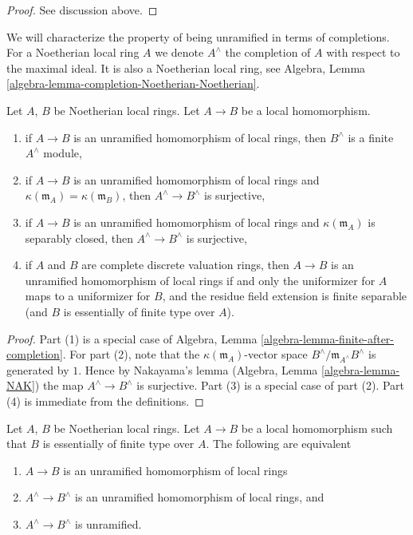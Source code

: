 \begin{proof}
See discussion above.
\end{proof}

\noindent
We will characterize the property of being unramified in terms
of completions. For a Noetherian local ring $A$
we denote $A^\wedge$ the completion of $A$ with respect to the
maximal ideal. It is also a Noetherian local ring, see
Algebra, Lemma \ref{algebra-lemma-completion-Noetherian-Noetherian}.

\begin{lemma}
\label{lemma-unramified-completions}
Let $A$, $B$ be Noetherian local rings.
Let $A \to B$ be a local homomorphism.
\begin{enumerate}
\item if $A \to B$ is an unramified homomorphism of local rings,
then $B^\wedge$ is a finite $A^\wedge$ module,
\item if $A \to B$ is an unramified homomorphism of local rings and
$\kappa(\mathfrak m_A) = \kappa(\mathfrak m_B)$,
then $A^\wedge \to B^\wedge$ is surjective,
\item if $A \to B$ is an unramified homomorphism of local rings
and $\kappa(\mathfrak m_A)$
is separably closed, then $A^\wedge \to B^\wedge$ is surjective,
\item if $A$ and $B$ are complete discrete valuation rings, then
$A \to B$ is an unramified homomorphism of local rings
if and only the uniformizer for $A$ maps to a uniformizer for $B$,
and the residue field extension is finite separable (and $B$ is
essentially of finite type over $A$).
\end{enumerate}
\end{lemma}

\begin{proof}
Part (1) is a special case of
Algebra, Lemma \ref{algebra-lemma-finite-after-completion}.
For part (2), note that the $\kappa(\mathfrak m_A)$-vector space
$B^\wedge/\mathfrak m_{A^\wedge}B^\wedge$
is generated by $1$. Hence by Nakayama's lemma
(Algebra, Lemma \ref{algebra-lemma-NAK}) the map
$A^\wedge \to B^\wedge$ is surjective.
Part (3) is a special case of part (2).
Part (4) is immediate from the definitions.
\end{proof}

\begin{lemma}
\label{lemma-characterize-unramified-completions}
Let $A$, $B$ be Noetherian local rings.
Let $A \to B$ be a local homomorphism such that $B$ is
essentially of finite type over $A$.
The following are equivalent
\begin{enumerate}
\item $A \to B$ is an unramified homomorphism of local rings
\item $A^\wedge \to B^\wedge$ is an unramified homomorphism of local rings, and
\item $A^\wedge \to B^\wedge$ is unramified.
\end{enumerate}
\end{lemma}


